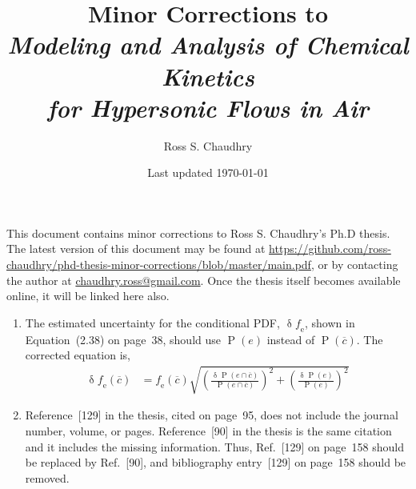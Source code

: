 \documentclass[11 pt]{article}
\title{Minor Corrections to \\
   \emph{Modeling and Analysis of Chemical Kinetics \\
         for Hypersonic Flows in Air} }
\author{Ross S. Chaudhry}
\date{Last updated \today}
\newcommand{\ol}{\overline}
\newcommand\myP{\operatorname{P}}
\newcommand\myerror{\operatorname{\delta}}
\newcommand\fe{\operatorname{\mathit{f}_e}}
\begin{document}
\maketitle

\noindent
This document contains minor corrections to Ross S. Chaudhry's Ph.D thesis.
The latest version of this document may be found at \url{https://github.com/ross-chaudhry/phd-thesis-minor-corrections/blob/master/main.pdf},
   or by contacting the author at \href{mailto:chaudhry.ross@gmail.com}{chaudhry.ross@gmail.com}.
Once the thesis itself becomes available online, it will be linked here also.


\begin{enumerate}

\item
The estimated uncertainty for the conditional PDF, $\myerror\fe$,
   shown in Equation~(2.38) on page~38, should use $\myP\left(e\right)$
   instead of $\myP\left(\ol{c}\right)$.
The corrected equation is,
%
\begin{align*}
   \myerror \fe\left(\ol{c}\right) &= \fe\left(\ol{c}\right) \sqrt{ \left(\frac{\myerror \myP\left(e \cap \ol{c}\right)}{\myP\left(e \cap \ol{c}\right)}\right)^2
                                                                  + \left(\frac{\myerror \myP\left(           e \right)}{\myP\left(           e \right)}\right)^2 }
\end{align*}

\item
Reference~[129] in the thesis, cited on page~95,
   does not include the journal number, volume, or pages.
Reference~[90] in the thesis is the same citation and it includes the missing information.
Thus, Ref.~[129] on page~158 should be replaced by Ref.~[90],
   and bibliography entry~[129] on page~158 should be removed.

% 

\end{enumerate}

% 
% 
\end{document}
